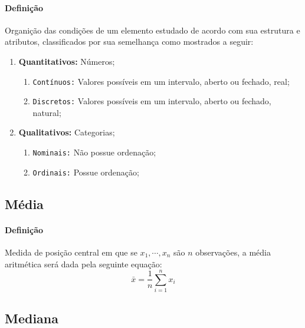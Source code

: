 \documentclass{article}
\begin{document}
            \paragraph{Definição}Organição das condições de um elemento estudado de acordo com sua estrutura e atributos, classificados por sua semelhança como mostrados a seguir:
                \begin{enumerate}[noitemsep]
                    \item \textbf{Quantitativos:} Números;
                        \begin{enumerate}[noitemsep]
                            \item \texttt{Contínuos:} Valores possíveis em um intervalo, aberto ou fechado, real;
                            \item \texttt{Discretos:} Valores possíveis em um intervalo, aberto ou fechado, natural;
                        \end{enumerate}
                    \item \textbf{Qualitativos:} Categorias;
                        \begin{enumerate}[noitemsep]
                            \item \texttt{Nominais:} Não possue ordenação;
                            \item \texttt{Ordinais:} Possue ordenação;
                        \end{enumerate}
                \end{enumerate}

        \subsection{Média}
            \paragraph{Definição}Medida de posição central em que se $x_{1}, \cdots, x_{n}$ são $n$ observações, a média aritmética será dada pela seguinte equação:
                \begin{equation}
                    \boxed{
                        \bar{x} = \frac{1}{n} \sum_{i = 1}^{n} x_{i}
                    }
                \end{equation}

        \subsection{Mediana}
\end{document}
